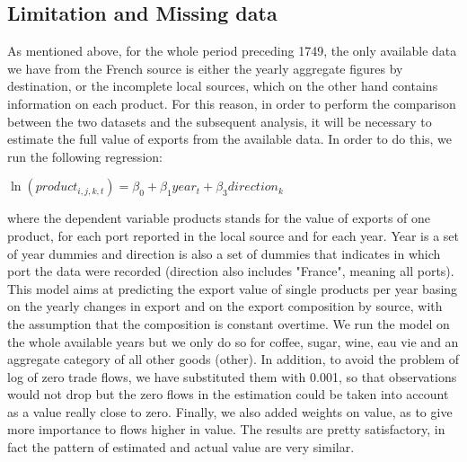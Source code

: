 \documentclass[12pt,a4paper,titlepage,english]{article}
\begin{document}
\subsection{Limitation and Missing data}
As mentioned above, for the whole period preceding 1749, the only available data we have from the French source is either the yearly aggregate figures by destination, or the incomplete local sources, which on the other hand contains information on each product. For this reason, in order to perform the comparison between the two datasets and the subsequent analysis, it will be necessary to estimate the full value of exports from the available data. In order to do this, we run the following regression:
\begin{center}
$\ln(product_{i,j,k,t})=\beta_0 + \beta_1year_t+\beta_3direction_k$
\end{center}
where the dependent variable products stands for the value of exports of one product, for each port reported in the local source and for each year. Year is a set of year dummies and direction is also a set of dummies that indicates in which port the data were recorded (direction also includes "France", meaning all ports). This model aims at predicting the export value of single products per year basing on the yearly changes in export and on the export composition by source, with the assumption that the composition is constant overtime. We run the model on the whole available years but we only do so for coffee, sugar, wine, eau vie and an aggregate category of all other goods (other). In addition, to avoid the problem of log of zero trade flows, we have substituted them with 0.001, so that observations would not drop but the zero flows in the estimation could be taken into account as a value really close to zero. Finally, we also added weights on value, as to give more importance to flows higher in value. The results are pretty satisfactory, in fact the pattern of estimated and actual value are very similar. 
\end{document}
